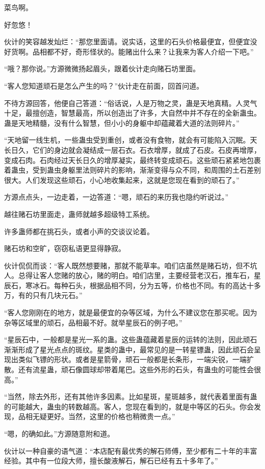 \begin{this_body}
菜鸟啊。

好忽悠！

伙计的笑容越发灿烂：“那您里面请。说实话，这里的石头价格最便宜，但便宜没好货啊。品相都不好，奇形怪状的。能赌出什么来？让我来为客人介绍一下吧。”

“哦？那你说。”方源微微扬起眉头，跟着伙计走向赌石坊里面。

“客人您知道顽石是怎么产生的吗？”伙计走在前面，回首问道。

不待方源回答，他便自己答道：“俗话说，人是万物之灵，蛊是天地真精。人灵气十足，最擅创造，智慧最高，所以创造出了许多，大自然中并不存在的全新蛊虫。蛊是天地精髓，没有什么智慧，但小小的身躯中却蕴藏着大道的法则碎片。”

“天地留一线生机，一些蛊虫受到重创，或者没有食物，就会有可能陷入沉眠。天长日久，它们的身边就会凝结成一层石衣。石衣增厚，就成了石皮。石皮再增厚，变成石肉。石肉经过天长日久的增厚凝实，最终转变成顽石。这些顽石紧紧地包裹着蛊虫，受到蛊虫身躯里法则碎片的影响，渐渐变得与众不同，和周围的土石差别很大。人们发现这些顽石，小心地收集起来，这就是您现在看到的顽石了。”

方源点点头，一边走着，一边答道：“嗯，顽石的来历我也隐约听说过。”

越往赌石坊里面走，蛊师就越多超级特工系统。

许多蛊师都在挑石头，或者小声的交谈议论着。

赌石坊和空旷，窃窃私语更显得静寂。

伙计侃侃而谈：“客人既然想要赌，那就不能草率。咱们店虽然是赌石坊，但不坑人。总得让客人您赌的放心，赌的明白。咱们店里，主要经营老汉石，推车石，星辰石，寒冰石。每种石头，根据品相不同，分为五等，价格也不同。有的高达十多万，有的只有几块元石。”

“客人您刚刚在的地方，就是最便宜的杂等区域，为什么不建议您在那买呢。因为杂等区域里的顽石，品相最不好。就举星辰石的例子吧。”

“星辰石中，一般都是星光一系的蛊。这些蛊蕴藏着星辰的运转的法则，因此顽石渐渐形成了星光点点的斑纹。星类的蛊中，最常见的是一转星镖蛊，因此顽石会呈现出类似飞镖的形状。或者是星箭骨，顽石一般都是长条形，一端尖锐，一端扩散。还有流星蛊，顽石像圆球却带着尾巴。这些外形的石头，有蛊虫的可能性会很高。”

“当然，除去外形，还有其他许多因素。比如星斑，星斑越多，就代表着里面有蛊的可能越大，蛊虫的转数越高。客人，您现在看到的，就是中等区的石头。你会发现，品相无疑更好。当然，这里的价格也稍微贵一点。”

“嗯，的确如此。”方源随意附和道。

伙计以一种自豪的语气道：“本店配有最优秀的解石师傅，至少都有二十年的丰富经验。其中有一位段大师，擅长酸液解石，解石已经有五十多年了。”


\end{this_body}

